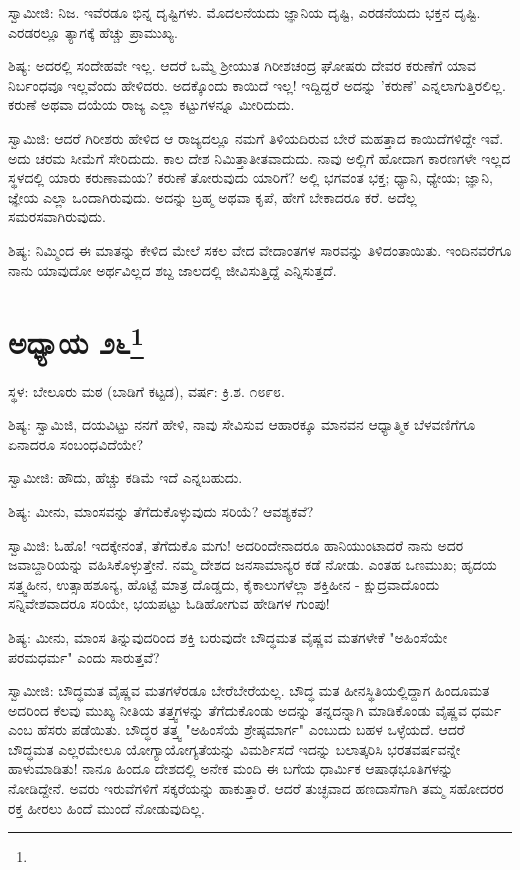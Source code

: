 ಸ್ವಾಮೀಜಿ: ನಿಜ. ಇವೆರಡೂ ಭಿನ್ನ ದೃಷ್ಟಿಗಳು. ಮೊದಲನೆಯದು ಜ್ಞಾನಿಯ ದೃಷ್ಟಿ, ಎರಡನೆಯದು ಭಕ್ತನ ದೃಷ್ಟಿ. ಎರಡರಲ್ಲೂ ತ್ಯಾಗಕ್ಕೆ ಹೆಚ್ಚು ಪ್ರಾಮುಖ್ಯ.

ಶಿಷ್ಯ: ಅದರಲ್ಲಿ ಸಂದೇಹವೇ ಇಲ್ಲ. ಆದರೆ ಒಮ್ಮೆ ಶ‍್ರೀಯುತ ಗಿರೀಶಚಂದ್ರ ಘೋಷರು ದೇವರ ಕರುಣೆಗೆ ಯಾವ ನಿರ್ಬಂಧವೂ ಇಲ್ಲವೆಂದು ಹೇಳಿದರು. ಅದಕ್ಕೊಂದು ಕಾಯಿದೆ ಇಲ್ಲ! ಇದ್ದಿದ್ದರೆ ಅದನ್ನು 'ಕರುಣೆ' ಎನ್ನಲಾಗುತ್ತಿರಲಿಲ್ಲ. ಕರುಣೆ ಅಥವಾ ದಯೆಯ ರಾಜ್ಯ ಎಲ್ಲಾ ಕಟ್ಟುಗಳನ್ನೂ ಮೀರಿದುದು.

ಸ್ವಾಮಿಜಿ: ಆದರೆ ಗಿರೀಶರು ಹೇಳಿದ ಆ ರಾಜ್ಯದಲ್ಲೂ ನಮಗೆ ತಿಳಿಯದಿರುವ ಬೇರೆ ಮಹತ್ತಾದ ಕಾಯಿದೆಗಳಿದ್ದೇ ಇವೆ. ಅದು ಚರಮ ಸೀಮೆಗೆ ಸೇರಿದುದು. ಕಾಲ ದೇಶ ನಿಮಿತ್ತಾತೀತವಾದುದು. ನಾವು ಅಲ್ಲಿಗೆ ಹೋದಾಗ ಕಾರಣಗಳೇ ಇಲ್ಲದ ಸ್ಥಳದಲ್ಲಿ ಯಾರು ಕರುಣಾಮಯ? ಕರುಣೆ ತೋರುವುದು ಯಾರಿಗೆ? ಅಲ್ಲಿ ಭಗವಂತ ಭಕ್ತ; ಧ್ಯಾನಿ, ಧ್ಯೇಯ; ಜ್ಞಾನಿ, ಜ್ಞೇಯ ಎಲ್ಲಾ ಒಂದಾಗಿರುವುದು. ಅದನ್ನು ಬ್ರಹ್ಮ ಅಥವಾ ಕೃಪೆ, ಹೇಗೆ ಬೇಕಾದರೂ ಕರೆ. ಅದೆಲ್ಲ ಸಮರಸವಾಗಿರುವುದು.

ಶಿಷ್ಯ: ನಿಮ್ಮಿಂದ ಈ ಮಾತನ್ನು ಕೇಳಿದ ಮೇಲೆ ಸಕಲ ವೇದ ವೇದಾಂತಗಳ ಸಾರವನ್ನು ತಿಳಿದಂತಾಯಿತು. ಇಂದಿನವರೆಗೂ ನಾನು ಯಾವುದೋ ಅರ್ಥವಿಲ್ಲದ ಶಬ್ದ ಜಾಲದಲ್ಲಿ ಜೀವಿಸುತ್ತಿದ್ದೆ ಎನ್ನಿಸುತ್ತದೆ.

\newpage

\chapter[ಅಧ್ಯಾಯ ೨೬]{ಅಧ್ಯಾಯ ೨೬\protect\footnote{}}

\begin{center}
ಸ್ಥಳ: ಬೇಲೂರು ಮಠ (ಬಾಡಿಗೆ ಕಟ್ಟಡ), ವರ್ಷ: ಕ್ರಿ.ಶ. ೧೮೯೮.
\end{center}

ಶಿಷ್ಯ: ಸ್ವಾಮಿಜಿ, ದಯವಿಟ್ಟು ನನಗೆ ಹೇಳಿ, ನಾವು ಸೇವಿಸುವ ಆಹಾರಕ್ಕೂ ಮಾನವನ ಆಧ್ಯಾತ್ಮಿಕ ಬೆಳವಣಿಗೆಗೂ ಏನಾದರೂ ಸಂಬಂಧವಿದೆಯೇ?

ಸ್ವಾಮೀಜಿ: ಹೌದು, ಹೆಚ್ಚು ಕಡಿಮೆ ಇದೆ ಎನ್ನಬಹುದು.

ಶಿಷ್ಯ: ಮೀನು, ಮಾಂಸವನ್ನು ತೆಗೆದುಕೊಳ್ಳುವುದು ಸರಿಯೆ? ಆವಶ್ಯಕವೆ?

ಸ್ವಾಮಿಜಿ: ಓಹೊ! ಇದಕ್ಕೇನಂತೆ, ತೆಗೆದುಕೊ ಮಗು! ಅದರಿಂದೇನಾದರೂ ಹಾನಿಯುಂಟಾದರೆ ನಾನು ಅದರ ಜವಾಬ್ದಾರಿಯನ್ನು ವಹಿಸಿಕೊಳ್ಳುತ್ತೇನೆ. ನಮ್ಮ ದೇಶದ ಜನಸಾಮಾನ್ಯರ ಕಡೆ ನೋಡು. ಎಂತಹ ಒಣಮುಖ; ಹೃದಯ ಸತ್ತ್ವಹೀನ, ಉತ್ಸಾಹಶೂನ್ಯ, ಹೊಟ್ಟೆ ಮಾತ್ರ ದೊಡ್ಡದು, ಕೈಕಾಲುಗಳೆಲ್ಲಾ ಶಕ್ತಿಹೀನ - ಕ್ಷುದ್ರವಾದೊಂದು ಸನ್ನಿವೇಶವಾದರೂ ಸರಿಯೇ, ಭಯಪಟ್ಟು ಓಡಿಹೋಗುವ ಹೇಡಿಗಳ ಗುಂಪು!

ಶಿಷ್ಯ: ಮೀನು, ಮಾಂಸ ತಿನ್ನುವುದರಿಂದ ಶಕ್ತಿ ಬರುವುದೇ ಬೌದ್ಧಮತ ವೈಷ್ಣವ ಮತಗಳೇಕೆ "ಅಹಿಂಸೆಯೇ ಪರಮಧರ್ಮ" ಎಂದು ಸಾರುತ್ತವೆ?

ಸ್ವಾಮೀಜಿ: ಬೌದ್ಧಮತ ವೈಷ್ಣವ ಮತಗಳೆರಡೂ ಬೇರೆಬೇರೆಯಲ್ಲ. ಬೌದ್ಧ ಮತ ಹೀನಸ್ಥಿತಿಯಲ್ಲಿದ್ದಾಗ ಹಿಂದೂಮತ ಅದರಿಂದ ಕೆಲವು ಮುಖ್ಯ ನೀತಿಯ ತತ್ತ್ವಗಳನ್ನು ತೆಗೆದುಕೊಂಡು ಅದನ್ನು ತನ್ನದನ್ನಾಗಿ ಮಾಡಿಕೊಂಡು ವೈಷ್ಣವ ಧರ್ಮ ಎಂಬ ಹೆಸರು ಪಡೆಯಿತು. ಬೌದ್ಧರ ತತ್ತ್ವ "ಅಹಿಂಸೆಯೆ ಶ್ರೇಷ್ಠಮಾರ್ಗ" ಎಂಬುದು ಬಹಳ ಒಳ್ಳೆಯದೆ. ಆದರೆ ಬೌದ್ಧಮತ ಎಲ್ಲರಮೇಲೂ ಯೋಗ್ಯಾಯೋಗ್ಯತೆಯನ್ನು ವಿಮರ್ಶಿಸದೆ ಇದನ್ನು ಬಲಾತ್ಕರಿಸಿ ಭರತವರ್ಷವನ್ನೇ ಹಾಳುಮಾಡಿತು! ನಾನೂ ಹಿಂದೂ ದೇಶದಲ್ಲಿ ಅನೇಕ ಮಂದಿ ಈ ಬಗೆಯ ಧಾರ್ಮಿಕ ಆಷಾಢಭೂತಿಗಳನ್ನು ನೋಡಿದ್ದೇನೆ. ಅವರು ಇರುವೆಗಳಿಗೆ ಸಕ್ಕರೆಯನ್ನು ಹಾಕುತ್ತಾರೆ. ಆದರೆ ತುಚ್ಛವಾದ ಹಣದಾಸೆಗಾಗಿ ತಮ್ಮ ಸಹೋದರರ ರಕ್ತ ಹೀರಲು ಹಿಂದೆ ಮುಂದೆ ನೋಡುವುದಿಲ್ಲ.

